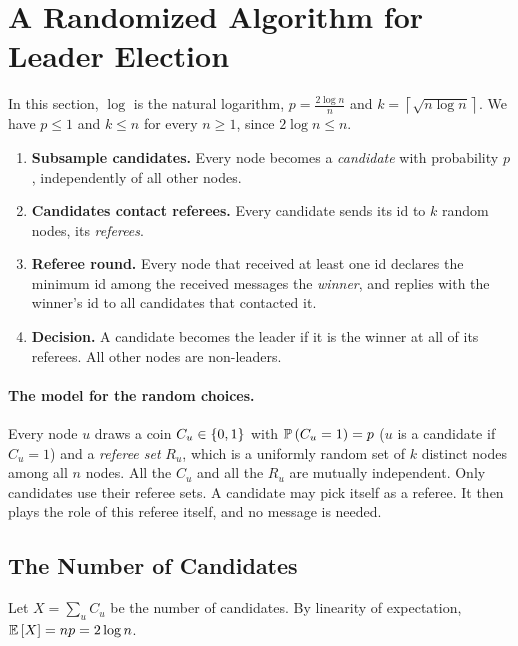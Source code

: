 \section{A Randomized Algorithm for Leader Election}

In this section, $\log$ is the natural logarithm, $p = \frac{2 \log n}{n}$ and
$k = \left\lceil \sqrt{n \log n} \right\rceil$. We have $p \leq 1$ and $k \leq n$ for every
$n \geq 1$, since $2 \log n \leq n$.
\begin{enumerate}
    \item \textbf{Subsample candidates.} Every node becomes a \emph{candidate} with probability $p$,
          independently of all other nodes.
    \item \textbf{Candidates contact referees.} Every candidate sends its id to $k$ random nodes,
          its \emph{referees}.
    \item \textbf{Referee round.} Every node that received at least one id declares the minimum id
          among the received messages the \emph{winner}, and replies with the winner's id to all
          candidates that contacted it.
    \item \textbf{Decision.} A candidate becomes the leader if it is the winner at all of its
          referees. All other nodes are non-leaders.
\end{enumerate}

\paragraph{The model for the random choices.} Every node $u$ draws a coin $C_u \in \left\lbrace0,1\right\rbrace$ with
$\prob{C_u = 1} = p$ ($u$ is a candidate if $C_u = 1$) and a \emph{referee set} $R_u$, which is a
uniformly random set of $k$ distinct nodes among all $n$ nodes. All the $C_u$ and all the $R_u$ are
mutually independent. Only candidates use their referee sets. A candidate may pick itself as a
referee. It then plays the role of this referee itself, and no message is needed.

\subsection{The Number of Candidates}

Let $X = \sum_{u} C_u$ be the number of candidates. By linearity of expectation,
$\expectation{X} = np = 2 \log n$.


